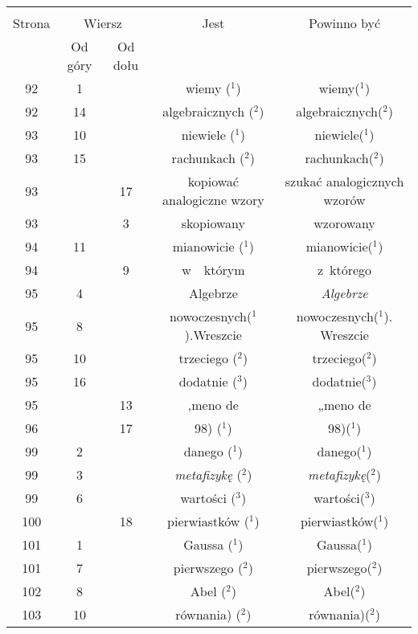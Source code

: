 \documentclass[a4paper,11pt]{article}
\begin{document}
\begin{center}
  \begin{tabular}{|c|c|c|c|c|}
    \hline
    & \multicolumn{2}{c|}{} & & \\
    Strona & \multicolumn{2}{c|}{Wiersz} & Jest
                              & Powinno być \\ \cline{2-3}
    & Od góry & Od dołu & & \\
    \hline
    92  &  1 & & wiemy ($^{ 1 }$) & wiemy($^{ 1 }$) \\
    92  & 14 & & algebraicznych ($^{ 2 }$) & algebraicznych($^{ 2 }$) \\
    93  & 10 & & niewiele ($^{ 1 }$) & niewiele($^{ 1 }$) \\
    93  & 15 & & rachunkach ($^{ 2 }$) & rachunkach($^{ 2 }$) \\
    93  & & 17 & kopiować analogiczne wzory & szukać analogicznych
                                              wzorów \\
    93  & &  3 & skopiowany & wzorowany \\
    94  & 11 & & mianowicie ($^{ 1 }$) & mianowicie($^{ 1 }$) \\
    94  & &  9 & w~~którym & z~którego \\
    95  &  4 & & Algebrze & \textit{Algebrze} \\
    95  &  8 & & nowoczesnych($^{ 1 }$).Wreszcie
           & nowoczesnych($^{ 1 }$). Wreszcie \\
    95  & 10 & & trzeciego ($^{ 2 }$) & trzeciego($^{ 2 }$) \\
    95  & 16 & & dodatnie ($^{ 3 }$) & dodatnie($^{ 3 }$) \\
    95  & & 13 & ,meno de & „meno de \\
    96  & & 17 & 98) ($^{ 1 }$) & 98)($^{ 1 }$) \\
    99  &  2 & & danego ($^{ 1 }$) & danego($^{ 1 }$) \\
    99  &  3 & & \textit{metafizykę} ($^{ 2 }$)
           & \textit{metafizykę}($^{ 2 }$) \\
    99  &  6 & & wartości ($^{ 3 }$) & wartości($^{ 3 }$) \\
    100 & & 18 & pierwiastków ($^{ 1 }$) & pierwiastków($^{ 1 }$) \\
    101 &  1 & & Gaussa ($^{ 1 }$) & Gaussa($^{ 1 }$) \\
    101 &  7 & & pierwszego ($^{ 2 }$) & pierwszego($^{ 2 }$) \\
    102 &  8 & & Abel ($^{ 2 }$) & Abel($^{ 2 }$) \\
    103 & 10 & & równania) ($^{ 2 }$) & równania)($^{ 2 }$) \\

\end{tabular}
\end{center}
\end{document}
